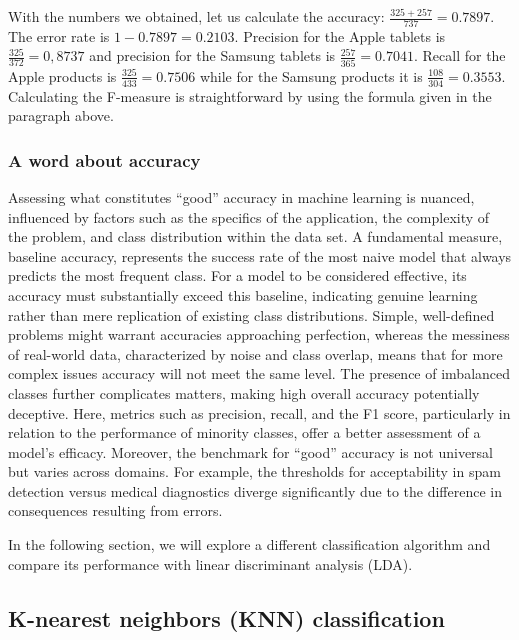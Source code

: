 With the numbers we obtained, let us calculate the accuracy:
\(\frac{325 + 257}{737}=0.7897\). The error rate is \(1-0.7897=0.2103\).
Precision for the Apple tablets is \(\frac{325}{372}=0,8737\) and
precision for the Samsung tablets is \(\frac{257}{365}=0.7041\). Recall
for the Apple products is \(\frac{325}{433}=0.7506\) while for the
Samsung products it is \(\frac{108}{304}=0.3553\). Calculating the
F-measure is straightforward by using the formula given in the paragraph above.

\subsubsection{A word about accuracy}\label{a-word-about-accuracy}

Assessing what constitutes ``good'' accuracy in machine learning is
nuanced, influenced by factors such as the specifics of the application,
the complexity of the problem, and class distribution within the data set. A
fundamental measure, baseline accuracy, represents the success rate of
the most naive model that always predicts the most frequent class. For a
model to be considered effective, its accuracy must substantially exceed
this baseline, indicating genuine learning rather than mere replication
of existing class distributions. Simple, well-defined problems might
warrant accuracies approaching perfection, whereas the messiness of
real-world data, characterized by noise and class overlap, means that for more complex issues accuracy will not meet the same level. The presence of imbalanced classes
further complicates matters, making high overall accuracy potentially
deceptive. Here, metrics such as precision, recall, and the F1 score,
particularly in relation to the performance of minority classes, offer a better
assessment of a model's efficacy. Moreover, the benchmark for ``good''
accuracy is not universal but varies across domains. For example, the
thresholds for acceptability in spam detection versus medical
diagnostics diverge significantly due to the difference in consequences resulting from
errors.

In the following section, we will explore a different classification
algorithm and compare its performance with linear discriminant analysis
(LDA).

\subsection{K-nearest neighbors (KNN)
classification}\label{k-nearest-neighbors-knn-classification}

